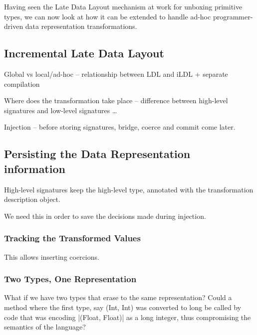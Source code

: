 Having seen the Late Data Layout mechanism at work for unboxing primitive types, we can now look at how it can be extended to handle ad-hoc programmer-driven data representation transformations.

\subsection{Incremental Late Data Layout}

Global vs local/ad-hoc -- relationship between LDL and iLDL + separate compilation

Where does the transformation take place -- difference between high-level signatures and low-level signatures \ldots

Injection -- before storing signatures, bridge, coerce and commit come later.

\subsection{Persisting the Data Representation information}
\label{sec:ildl:signatures}

High-level signatures keep the high-level type, annotated with the transformation description object.

We need this in order to save the decisions made during injection.

\subsubsection{Tracking the Transformed Values}
This allows inserting coercions.

\subsubsection{Two Types, One Representation}

What if we have two types that erase to the same representation? Could a method where the first type, say (Int, Int) was converted to long be called by code that was encoding |(Float, Float)| as a long integer, thus compromising the semantics of the language?

